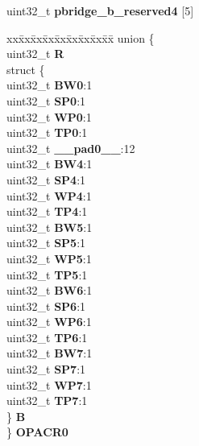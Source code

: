 \begin{DoxyCompactItemize}
\begin{tabbing}
\end{tabbing}\item 
\mbox{\label{structPBRIDGE__B__tag_a1a5887fb49965b79d75701920905a084}} 
uint32\+\_\+t {\bfseries pbridge\+\_\+b\+\_\+reserved4} \mbox{[}5\mbox{]}
\item 
\mbox{\label{structPBRIDGE__B__tag_a74e1253b86b9a91aa30b70afc5e35604}} 
\begin{tabbing}
xx\=xx\=xx\=xx\=xx\=xx\=xx\=xx\=xx\=\kill
union \{\\
\>uint32\_t {\bfseries R}\\
\>struct \{\\
\>\>uint32\_t {\bfseries BW0}:1\\
\>\>uint32\_t {\bfseries SP0}:1\\
\>\>uint32\_t {\bfseries WP0}:1\\
\>\>uint32\_t {\bfseries TP0}:1\\
\>\>uint32\_t {\bfseries \_\_pad0\_\_}:12\\
\>\>uint32\_t {\bfseries BW4}:1\\
\>\>uint32\_t {\bfseries SP4}:1\\
\>\>uint32\_t {\bfseries WP4}:1\\
\>\>uint32\_t {\bfseries TP4}:1\\
\>\>uint32\_t {\bfseries BW5}:1\\
\>\>uint32\_t {\bfseries SP5}:1\\
\>\>uint32\_t {\bfseries WP5}:1\\
\>\>uint32\_t {\bfseries TP5}:1\\
\>\>uint32\_t {\bfseries BW6}:1\\
\>\>uint32\_t {\bfseries SP6}:1\\
\>\>uint32\_t {\bfseries WP6}:1\\
\>\>uint32\_t {\bfseries TP6}:1\\
\>\>uint32\_t {\bfseries BW7}:1\\
\>\>uint32\_t {\bfseries SP7}:1\\
\>\>uint32\_t {\bfseries WP7}:1\\
\>\>uint32\_t {\bfseries TP7}:1\\
\>\} {\bfseries B}\\
\} {\bfseries OPACR0}\\


\end{tabbing}
\end{DoxyCompactItemize}
